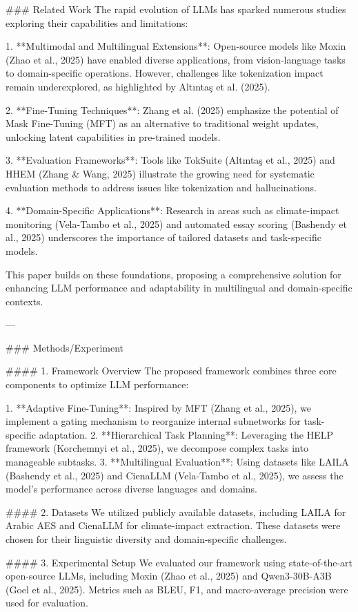 ### Related Work  
The rapid evolution of LLMs has sparked numerous studies exploring their capabilities and limitations:

1. **Multimodal and Multilingual Extensions**: Open-source models like Moxin (Zhao et al., 2025) have enabled diverse applications, from vision-language tasks to domain-specific operations. However, challenges like tokenization impact remain underexplored, as highlighted by Altıntaş et al. (2025).

2. **Fine-Tuning Techniques**: Zhang et al. (2025) emphasize the potential of Mask Fine-Tuning (MFT) as an alternative to traditional weight updates, unlocking latent capabilities in pre-trained models.

3. **Evaluation Frameworks**: Tools like TokSuite (Altıntaş et al., 2025) and HHEM (Zhang & Wang, 2025) illustrate the growing need for systematic evaluation methods to address issues like tokenization and hallucinations.

4. **Domain-Specific Applications**: Research in areas such as climate-impact monitoring (Vela-Tambo et al., 2025) and automated essay scoring (Bashendy et al., 2025) underscores the importance of tailored datasets and task-specific models.

This paper builds on these foundations, proposing a comprehensive solution for enhancing LLM performance and adaptability in multilingual and domain-specific contexts.

---

### Methods/Experiment  

#### 1. Framework Overview  
The proposed framework combines three core components to optimize LLM performance:

1. **Adaptive Fine-Tuning**: Inspired by MFT (Zhang et al., 2025), we implement a gating mechanism to reorganize internal subnetworks for task-specific adaptation.
2. **Hierarchical Task Planning**: Leveraging the HELP framework (Korchemnyi et al., 2025), we decompose complex tasks into manageable subtasks.
3. **Multilingual Evaluation**: Using datasets like LAILA (Bashendy et al., 2025) and CienaLLM (Vela-Tambo et al., 2025), we assess the model's performance across diverse languages and domains.

#### 2. Datasets  
We utilized publicly available datasets, including LAILA for Arabic AES and CienaLLM for climate-impact extraction. These datasets were chosen for their linguistic diversity and domain-specific challenges.

#### 3. Experimental Setup  
We evaluated our framework using state-of-the-art open-source LLMs, including Moxin (Zhao et al., 2025) and Qwen3-30B-A3B (Goel et al., 2025). Metrics such as BLEU, F1, and macro-average precision were used for evaluation.

